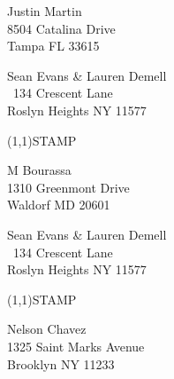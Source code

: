 \documentclass[12pt]{article}
\begin{document}
\begin{center} \begin{Huge} \vspace*{\fill}
Justin Martin\\
8504 Catalina Drive\\
Tampa FL 33615\\
\vspace{\fill} \end{Huge} \end{center}

\clearpage

\begin{minipage}{.5\linewidth} \noindent
Sean Evans \& Lauren Demell\\\ 
134 Crescent Lane\\ 
Roslyn Heights NY 11577
\end{minipage}
\begin{minipage}{.5\linewidth \hspace{-.2in} \vspace{-.3in}}
\begin{flushright}
\framebox(1,1){STAMP}
\end{flushright}
\end{minipage}

\begin{center} \begin{Huge} \vspace*{\fill}
M Bourassa\\
1310 Greenmont Drive\\
Waldorf MD 20601\\
\vspace{\fill} \end{Huge} \end{center}

\clearpage

\begin{minipage}{.5\linewidth} \noindent
Sean Evans \& Lauren Demell\\\ 
134 Crescent Lane\\ 
Roslyn Heights NY 11577
\end{minipage}
\begin{minipage}{.5\linewidth \hspace{-.2in} \vspace{-.3in}}
\begin{flushright}
\framebox(1,1){STAMP}
\end{flushright}
\end{minipage}

\begin{center} \begin{Huge} \vspace*{\fill}
Nelson Chavez\\
1325 Saint Marks Avenue\\
Brooklyn NY 11233\\
\vspace{\fill} \end{Huge} \end{center}
\end{document}
